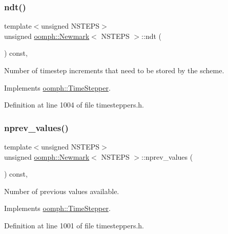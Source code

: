 \subsubsection{\texorpdfstring{ndt()}{ndt()}}
{\footnotesize\ttfamily template$<$unsigned N\+S\+T\+E\+PS$>$ \\
unsigned \hyperlink{classoomph_1_1Newmark}{oomph\+::\+Newmark}$<$ N\+S\+T\+E\+PS $>$\+::ndt (\begin{DoxyParamCaption}{ }\end{DoxyParamCaption}) const\hspace{0.3cm}{\ttfamily [inline]}, {\ttfamily [virtual]}}



Number of timestep increments that need to be stored by the scheme. 



Implements \hyperlink{classoomph_1_1TimeStepper_a00e57b6436cff4fc82af481b81a78a1a}{oomph\+::\+Time\+Stepper}.



Definition at line 1004 of file timesteppers.\+h.

\mbox{\label{classoomph_1_1Newmark_a4628c97b9f580d0888cb911caf28b54f}} 
\subsubsection{\texorpdfstring{nprev\+\_\+values()}{nprev\_values()}}
{\footnotesize\ttfamily template$<$unsigned N\+S\+T\+E\+PS$>$ \\
unsigned \hyperlink{classoomph_1_1Newmark}{oomph\+::\+Newmark}$<$ N\+S\+T\+E\+PS $>$\+::nprev\+\_\+values (\begin{DoxyParamCaption}{ }\end{DoxyParamCaption}) const\hspace{0.3cm}{\ttfamily [inline]}, {\ttfamily [virtual]}}



Number of previous values available. 



Implements \hyperlink{classoomph_1_1TimeStepper_a0f38713ed304c18d9f7b5cf8131664c1}{oomph\+::\+Time\+Stepper}.



Definition at line 1001 of file timesteppers.\+h.

